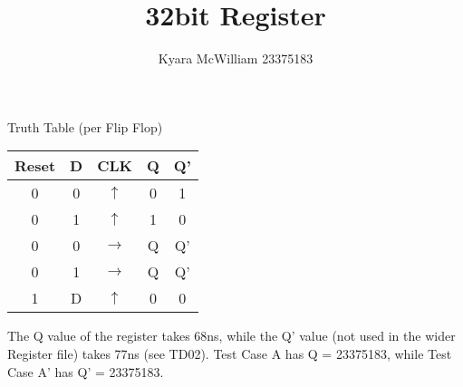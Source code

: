 \documentclass{article}
\title{32bit Register}
\author{Kyara McWilliam 23375183}
\date{}
\begin{document}
\maketitle

Truth Table (per Flip Flop)
\hfill \break

\begin{tabular}{ |c|c|c|c|c| }
\hline
Reset & D & CLK & Q & Q'\\
\hline
0 & 0 & $\uparrow$ & 0 & 1 \\
0 & 1 & $\uparrow$ & 1 & 0 \\
0 & 0 & $\rightarrow$ & Q & Q' \\
0 & 1 & $\rightarrow$ & Q & Q'\\
1 & D & $\uparrow$ & 0 & 0\\
\hline
\end{tabular}

\hfill \break \break
The Q value of the register takes 68ns, while the Q' value (not used in the wider Register file) takes 77ns (see TD02). \newline
Test Case A has Q = 23375183, while Test Case A' has Q' = 23375183.
\end{document}
